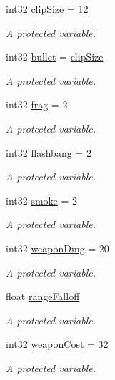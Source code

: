 \begin{DoxyCompactItemize}
int32 \hyperlink{class_a_unit2_d_a7947b8f9bed2225ed223f37f21820960}{clip\+Size} = 12
\begin{DoxyCompactList}\small\item\em A protected variable. \end{DoxyCompactList}\item 
int32 \hyperlink{class_a_unit2_d_a7f23a4544c24d5fd0489f2420a7b3eb4}{bullet} = \hyperlink{class_a_unit2_d_a7947b8f9bed2225ed223f37f21820960}{clip\+Size}
\begin{DoxyCompactList}\small\item\em A protected variable. \end{DoxyCompactList}\item 
int32 \hyperlink{class_a_unit2_d_ad2d855d2c78d2e1918b84df6ae4da192}{frag} = 2
\begin{DoxyCompactList}\small\item\em A protected variable. \end{DoxyCompactList}\item 
int32 \hyperlink{class_a_unit2_d_a898e4c6cf4c37c9a1b84d73a7fb30c6b}{flashbang} = 2
\begin{DoxyCompactList}\small\item\em A protected variable. \end{DoxyCompactList}\item 
int32 \hyperlink{class_a_unit2_d_a6cfd32ab7bfaa5dbc64defd1f74bf459}{smoke} = 2
\begin{DoxyCompactList}\small\item\em A protected variable. \end{DoxyCompactList}\item 
int32 \hyperlink{class_a_unit2_d_a583df0bd3be284fddf24c1c627053767}{weapon\+Dmg} = 20
\begin{DoxyCompactList}\small\item\em A protected variable. \end{DoxyCompactList}\item 
float \hyperlink{class_a_unit2_d_a6945ed1b7f56335e3c42d414f9e9b243}{range\+Falloff}
\begin{DoxyCompactList}\small\item\em A protected variable. \end{DoxyCompactList}\item 
int32 \hyperlink{class_a_unit2_d_ab8a5bca2e21f1c992b887646d19a7025}{weapon\+Cost} = 32
\begin{DoxyCompactList}\small\item\em A protected variable. \end{DoxyCompactList}\end{DoxyCompactItemize}


